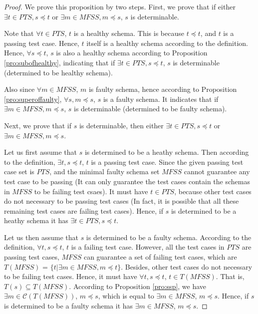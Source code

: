 \begin{proof}

We prove this proposition by two steps. First, we prove that if either $\exists t \in PTS, s \preceq t$ or $\exists m \in MFSS, m \preceq s$, $s$ is determinable.

Note that $\forall t \in PTS$, $t$ is a healthy schema. This is because $t \preceq t$, and $t$ is a passing test case. Hence, $t$ itself is a healthy schema according to the definition. Hence, $\forall s \preceq t$, $s$ is also a healthy schema according to Proposition \ref{pro:subofhealthy}, indicating that if $\exists t \in PTS, s \preceq t$, $s$ is determinable (determined to be healthy schema).

Also since $\forall m \in MFSS$, $m$ is faulty schema, hence according to Proposition \ref{pro:superoffaulty}, $\forall s,  m \preceq s$, $s$ is a faulty schema. It indicates that if $\exists m \in MFSS, m \preceq s$, $s$ is determinable (determined to be faulty schema).



Next, we prove that if $s$ is determinable, then either $\exists t \in PTS, s \preceq t$ or $\exists m \in MFSS, m \preceq s$.

Let us first assume that $s$ is determined to be a heathy schema. Then according to the definition, $\exists t, s \preceq t$, $t$ is a passing test case. Since the given passing test case set is $PTS$, and the minimal faulty schema set $MFSS$ cannot guarantee any test case to be passing (It can only guarantee the test cases contain the schemas in $MFSS$ to be failing test csaes). It must have $t \in PTS$, because other test cases do not necessary to be passing test cases (In fact, it is possible that all these remaining test cases are failing test cases). Hence, if $s$ is determined to be a heathy schema it has $\exists t \in PTS, s \preceq t$.

Let us then assume that $s$ is determined to be a faulty schema.  According to the definition, $\forall t, s \preceq t$, $t$ is a failing test case. However, all the test cases in $PTS$ are passing test cases, $MFSS$ can guarantee a set of failing test cases, which are $T(MFSS)$ = $\{ t | \exists m \in MFSS, m \preceq t \}$. Besides, other test cases do not necessary to be failing test cases.  Hence, it must have $\forall t, s \preceq t$, $t \in T(MFSS)$. That is, $T(s) \subseteq T(MFSS)$. According to Proposition \ref{pro:ssp}, we have $\exists m \in \mathcal{C}(T(MFSS))$, $m \preceq s$, which is equal to  $\exists m \in MFSS$, $m \preceq s$. Hence,  if $s$ is determined to be a faulty schema it has  $\exists m \in MFSS$, $m \preceq s$.


\end{proof}
